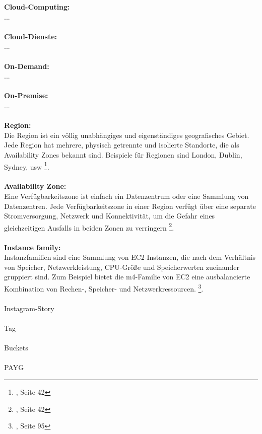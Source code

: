 

\textbf{Cloud-Computing:}\\
...
\\\\
\textbf{Cloud-Dienste:}\\
...
\\\\
\textbf{On-Demand:}\\
...
\\\\
\textbf{On-Premise:}\\
...
\\\\
\textbf{Region:}\\
Die Region ist ein völlig unabhängiges und eigenständiges geografisches Gebiet. Jede Region hat mehrere, physisch getrennte und isolierte Standorte, die als Availability Zones bekannt sind. Beispiele für Regionen sind London, Dublin, Sydney, usw \footnote{\cite{AWS1}, Seite 42}.
\\\\
\textbf{Availability Zone:}\\
Eine Verfügbarkeitszone ist einfach ein Datenzentrum oder eine Sammlung von Datenzentren. Jede Verfügbarkeitszone in einer Region verfügt über eine separate Stromversorgung, Netzwerk und Konnektivität, um die Gefahr eines gleichzeitigen Ausfalls in beiden Zonen zu verringern \footnote{\cite{AWS1}, Seite 42}.
\\\\

\textbf{Instance family:}\\
Instanzfamilien sind eine Sammlung von EC2-Instanzen, die nach dem Verhältnis von Speicher, Netzwerkleistung, CPU-Größe und Speicherwerten zueinander gruppiert sind. Zum Beispiel bietet die m4-Familie von EC2 eine ausbalancierte Kombination von Rechen-, Speicher- und Netzwerkressourcen. \footnote{\cite{AWS1}, Seite 95}.
\\\\
Instagram-Story
\\\\
Tag
\\\\
Buckets
\\\\
PAYG %